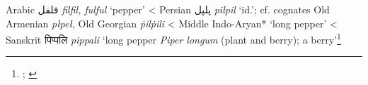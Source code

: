 \begin{etymology}\label{ety:fulful}
Arabic {فلفل} \textit{filfil, fulful} `pepper'
< Persian {پلپل} \textit{pilpil} `id.'; cf. cognates Old Armenian  \textit{płpeł}, Old Georgian  \textit{ṗilṗili}
< Middle Indo-Aryan* `long pepper'
< Sanskrit {पिप्पलि } \textit{pippali} `long pepper \textit{Piper longum} (plant and berry); a berry'\footnote{\textcite[2434]{lane_arabic-english_1863}; \textcite{SQ}}
\end{etymology}